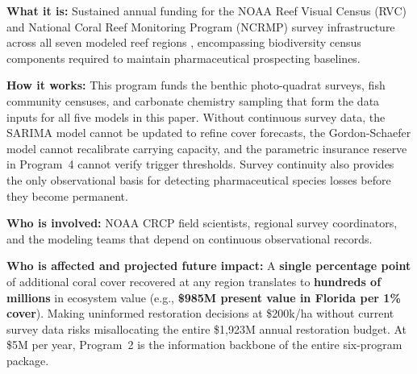 \documentclass[10pt,letterpaper]{article}
\begin{document}
\begin{tcolorbox}[title=Program 2: NOAA Reef Survey Funding --- \$5M Annual Total,
  colback=green!5, colframe=green!50!black, fonttitle=\bfseries, breakable]

  \textbf{What it is:} Sustained annual funding for the NOAA Reef Visual Census (RVC) and National Coral Reef Monitoring Program (NCRMP) survey infrastructure across all seven modeled reef regions \cite{noaa_rvc, noaa_ncrmp}, encompassing biodiversity census components required to maintain pharmaceutical prospecting baselines.

  \medskip
  \textbf{How it works:} This program funds the benthic photo-quadrat surveys, fish community censuses, and carbonate chemistry sampling that form the data inputs for all five models in this paper. Without continuous survey data, the SARIMA model cannot be updated to refine cover forecasts, the Gordon-Schaefer model cannot recalibrate carrying capacity, and the parametric insurance reserve in Program~4 cannot verify trigger thresholds. Survey continuity also provides the only observational basis for detecting pharmaceutical species losses before they become permanent.

  \medskip
  \textbf{Who is involved:} NOAA CRCP field scientists, regional survey coordinators, and the modeling teams that depend on continuous observational records.

  \medskip
  \textbf{Who is affected and projected future impact:} A \textbf{single percentage point} of additional coral cover recovered at any region translates to \textbf{hundreds of millions} in ecosystem value (e.g., \textbf{\$985M present value in Florida per 1\% cover}). Making uninformed restoration decisions at \$200k/ha without current survey data risks misallocating the entire \$1,923M annual restoration budget. At \$5M per year, Program~2 is the information backbone of the entire six-program package.
\end{tcolorbox}

\medskip
\end{document}
